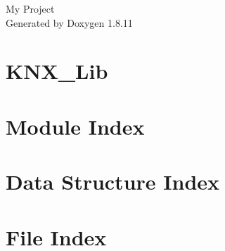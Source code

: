 \documentclass[twoside]{book}
\newcommand{\+}{\discretionary{\mbox{\scriptsize$\hookleftarrow$}}{}{}}
\newcommand{\clearemptydoublepage}{%
  \newpage{\pagestyle{empty}\cleardoublepage}%
}
\begin{document}
\hypersetup{pageanchor=false,
             bookmarksnumbered=true,
             pdfencoding=unicode
            }
\begin{titlepage}
\vspace*{7cm}
\begin{center}%
{\Large My Project }\\
\vspace*{1cm}
{\large Generated by Doxygen 1.8.11}\\
\end{center}
\end{titlepage}
\clearemptydoublepage
\tableofcontents
\clearemptydoublepage
{}
\hypersetup{pageanchor=true}

\chapter{K\+N\+X\+\_\+\+Lib}
\label{md_README}
\hypertarget{md_README}{}

\chapter{Module Index}

\chapter{Data Structure Index}

\chapter{File Index}

\end{document}
